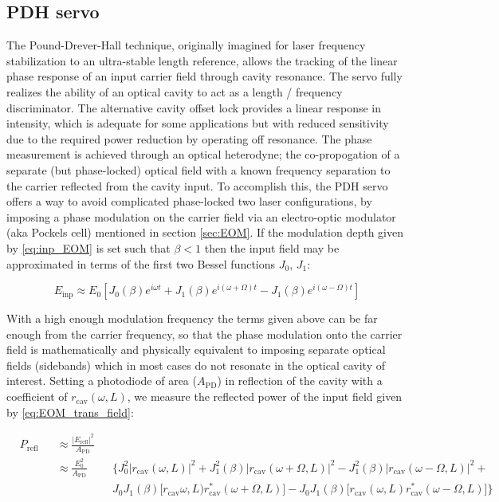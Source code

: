 \subsection{PDH servo}\label{subsubsec:pdh}
The Pound-Drever-Hall technique, originally imagined for laser frequency stabilization to an ultra-stable length reference, allows the tracking of the linear phase response of an input carrier field through cavity resonance. The servo fully realizes the ability of an optical cavity to act as a length / frequency discriminator. The alternative cavity offset lock provides a linear response in intensity, which is adequate for some applications but with reduced sensitivity due to the required power reduction by operating off resonance.
The phase measurement is achieved through an optical heterodyne; the co-propogation of a separate (but phase-locked) optical field with a known frequency separation to the carrier reflected from the cavity input. To accomplish this, the PDH servo offers a way to avoid complicated phase-locked two laser configurations, by imposing a phase modulation on the carrier field via an electro-optic modulator (aka Pockels cell) mentioned in section \ref{sec:EOM}. If the modulation depth given by \ref{eq:inp_EOM} is set such that $\beta < 1$ then the input field may be approximated in terms of the first two Bessel functions $J_0$, $J_1$:

\begin{equation} \label{eq:EOM_trans_field}
E_\mathrm{inp} \approx E_0 [J_0(\beta)e^{i \omega t} + J_1(\beta)e^{i (\omega + \Omega) t} - J_1(\beta)e^{i(\omega -\Omega)t}]
\end{equation}

With a high enough modulation frequency the terms given above can be far enough from the carrier frequency, so that the phase modulation onto the carrier field is mathematically and physically equivalent to imposing separate optical fields (sidebands) which in most cases do not resonate in the optical cavity of interest. Setting a photodiode of area ($A_\mathrm{PD}$) in reflection of the cavity with a coefficient of $r_\mathrm{cav}(\omega,L)$, we measure the reflected power of the input field given by \ref{eq:EOM_trans_field}:

\begin{equation}
 \begin{alignedat}{3}
    &P_\mathrm{refl} && \approx \frac{|E_\mathrm{refl}|^2}{A_\mathrm{PD}} && \\
    & &&\approx \frac{E_0^2}{A_\mathrm{PD}} && \bigg\{J_0^2 |r_\mathrm{cav}(\omega,L)|^2 + J_1^2(\beta)|r_\mathrm{cav}(\omega+\Omega,L)|^2 - J_1^2(\beta)|r_\mathrm{cav}(\omega-\Omega,L)|^2 +  \\
    & && && J_0J_1(\beta)\big[r_\mathrm{cav}\omega,L) r_\mathrm{cav}^*(\omega+\Omega,L)\big] - J_ 0J_1(\beta)\big[r_\mathrm{cav}(\omega,L)r_\mathrm{cav}^*(\omega-\Omega,L)\big]\bigg\}
  \end{alignedat}
\end{equation}

